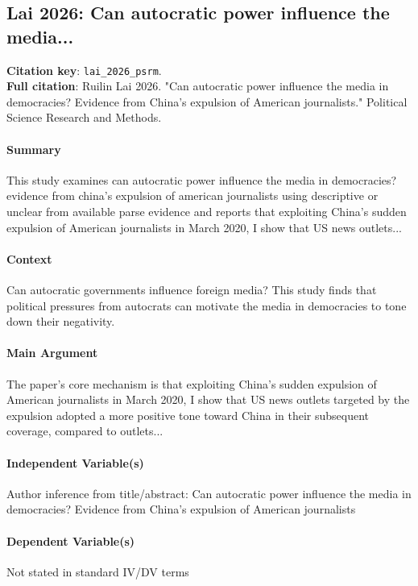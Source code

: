 \documentclass[12pt]{article}
\begin{document}
\subsection{Lai 2026: Can autocratic power influence the media...}
\textbf{Citation key}: \texttt{lai\_2026\_psrm}.\\
\textbf{Full citation}: Ruilin Lai 2026. "Can autocratic power influence the media in democracies? Evidence from China's expulsion of American journalists." Political Science Research and Methods.

\paragraph{Summary} This study examines can autocratic power influence the media in democracies? evidence from china's expulsion of american journalists using descriptive or unclear from available parse evidence and reports that exploiting China's sudden expulsion of American journalists in March 2020, I show that US news outlets...

\paragraph{Context} Can autocratic governments influence foreign media? This study finds that political pressures from autocrats can motivate the media in democracies to tone down their negativity.

\paragraph{Main Argument} The paper's core mechanism is that exploiting China's sudden expulsion of American journalists in March 2020, I show that US news outlets targeted by the expulsion adopted a more positive tone toward China in their subsequent coverage, compared to outlets...

\paragraph{Independent Variable(s)} Author inference from title/abstract: Can autocratic power influence the media in democracies? Evidence from China's expulsion of American journalists

\paragraph{Dependent Variable(s)} Not stated in standard IV/DV terms
\end{document}
